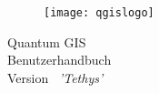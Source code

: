 
\begin{titlepage}
\begin{center}

\begin{figure}[H]
\begin{center}
\texttt{[image: qgislogo]} 
\end{center}
\end{figure}

\Huge{Quantum GIS}\\
\vspace{0.5cm}
\Large{Benutzerhandbuch} \\
\vspace{0.5cm}
\Large{Version ~\CURRENT \textsl{'Tethys'}}

\end{center}
\end{titlepage}

